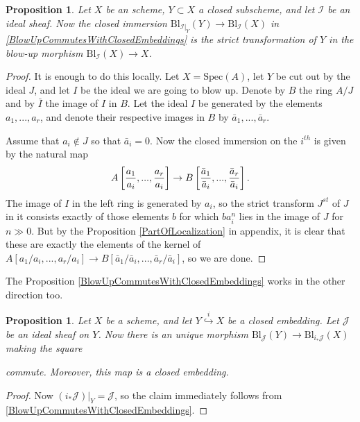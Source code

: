 \documentclass[12pt,a4paper,leqno]{article}
\newcommand{\spec}{\mathrm{Spec}}
\newcommand{\bl}{\mathrm{Bl}}
\newcommand{\fref}[1]{\hyperref[{#1}]{\ref*{#1}}}
\theoremstyle{plain}
\newtheorem{prop}[theo]{Proposition}
\theoremstyle{definition}
\theoremstyle{remark}
\begin{document}
\begin{prop}
Let $X$ be an scheme, $Y \subset X$ a closed subscheme, and let $\mathscr{I}$ be an ideal sheaf. Now the closed immersion $\bl_{\mathscr{I}|_Y}(Y) \to \bl_{\mathscr{I}} (X)$ in \fref{BlowUpCommutesWithClosedEmbeddings} is the strict transformation of $Y$ in the blow-up morphism $\bl_{\mathscr{I}} (X) \to X$.
\end{prop}
\begin{proof}
It is enough to do this locally. Let $X = \spec (A)$, let $Y$ be cut out by the ideal $J$, and let $I$ be the ideal we are going to blow up. Denote by $B$ the ring $A/J$ and by $\bar{I}$ the image of $I$ in $B$. Let the ideal $I$ be generated by the elements $a_1,...,a_r$, and denote their respective images in $B$ by $\bar a_1, ... , \bar a_r$. 

Assume that $a_i \not\in J$ so that $\bar a_i = 0$. Now the closed immersion on the $i^{th}$ is given by the natural map
\begin{equation*}
A \left[ {a_1 \over a_i}, ... , {a_r \over a_i} \right] \to B \left[ {\bar a_1 \over \bar a_i}, ... , {\bar a_r \over \bar a_i} \right].
\end{equation*}
The image of $I$ in the left ring is generated by $a_i$, so the strict transform $J^{st}$ of $J$ in it consists exactly of those elements $b$ for which $b a_i^n$ lies in the image of $J$ for $n \gg 0$. But by the Proposition \fref{PartOfLocalization} in appendix, it is clear that these are exactly the elements of the kernel of $A \left[ {a_1 / a_i}, ... , {a_r / a_i} \right] \to B \left[ {\bar a_1 / \bar a_i}, ... , {\bar a_r / \bar a_i} \right]$, so we are done.
\end{proof}

The Proposition \fref{BlowUpCommutesWithClosedEmbeddings} works in the other direction too.

\begin{prop}
Let $X$ be a scheme, and let $Y \stackrel{i}{\hookrightarrow} X$ be a closed embedding. Let $\mathscr{J}$ be an ideal sheaf on $Y$. Now there is an unique morphism $\bl_{\mathscr{J}}(Y) \to \bl_{i_*\mathscr{J}}(X)$ making the square
\begin{center}
\end{center}
commute. Moreover, this map is a closed embedding.
\end{prop}
\begin{proof}
Now $(i_*\mathscr{J})|_Y = \mathscr{J}$, so the claim immediately follows from \fref{BlowUpCommutesWithClosedEmbeddings}.
\end{proof}
\end{document}
